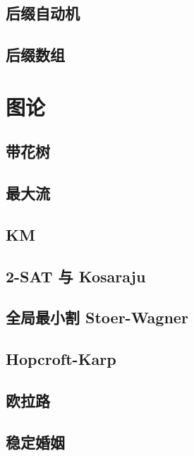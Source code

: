 \documentclass[10pt]{article}
\begin{document}
	\subsection{后缀自动机}
		

	\subsection{后缀数组}
		

\section{图论}
	\subsection{带花树}
		

	\subsection{最大流}
		
	
	\subsection{KM}
		

	\subsection{2-SAT 与 Kosaraju}
		

	\subsection{全局最小割 Stoer-Wagner}
		

	\subsection{Hopcroft-Karp}
		

	\subsection{欧拉路}
		

	\subsection{稳定婚姻}
		
\end{document}
